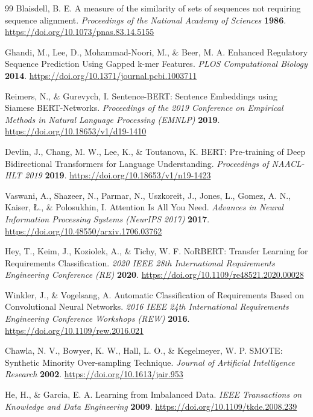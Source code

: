 \begin{thebibliography}{99}
Blaisdell, B. E. A measure of the similarity of sets of sequences not requiring sequence alignment. \emph{Proceedings of the National Academy of Sciences} \textbf{1986}. \url{https://doi.org/10.1073/pnas.83.14.5155}

Ghandi, M., Lee, D., Mohammad-Noori, M., \& Beer, M. A. Enhanced Regulatory Sequence Prediction Using Gapped k-mer Features. \emph{PLOS Computational Biology} \textbf{2014}. \url{https://doi.org/10.1371/journal.pcbi.1003711}

Reimers, N., \& Gurevych, I. Sentence-BERT: Sentence Embeddings using Siamese BERT-Networks. \emph{Proceedings of the 2019 Conference on Empirical Methods in Natural Language Processing (EMNLP)} \textbf{2019}. \url{https://doi.org/10.18653/v1/d19-1410}

Devlin, J., Chang, M. W., Lee, K., \& Toutanova, K. BERT: Pre-training of Deep Bidirectional Transformers for Language Understanding. \emph{Proceedings of NAACL-HLT 2019} \textbf{2019}. \url{https://doi.org/10.18653/v1/n19-1423}

Vaswani, A., Shazeer, N., Parmar, N., Uszkoreit, J., Jones, L., Gomez, A. N., Kaiser, Ł., \& Polosukhin, I. Attention Is All You Need. \emph{Advances in Neural Information Processing Systems (NeurIPS 2017)} \textbf{2017}. \url{https://doi.org/10.48550/arxiv.1706.03762}

Hey, T., Keim, J., Koziolek, A., \& Tichy, W. F. NoRBERT: Transfer Learning for Requirements Classification. \emph{2020 IEEE 28th International Requirements Engineering Conference (RE)} \textbf{2020}. \url{https://doi.org/10.1109/re48521.2020.00028}

Winkler, J., \& Vogelsang, A. Automatic Classification of Requirements Based on Convolutional Neural Networks. \emph{2016 IEEE 24th International Requirements Engineering Conference Workshops (REW)} \textbf{2016}. \url{https://doi.org/10.1109/rew.2016.021}

Chawla, N. V., Bowyer, K. W., Hall, L. O., \& Kegelmeyer, W. P. SMOTE: Synthetic Minority Over-sampling Technique. \emph{Journal of Artificial Intelligence Research} \textbf{2002}. \url{https://doi.org/10.1613/jair.953}

He, H., \& Garcia, E. A. Learning from Imbalanced Data. \emph{IEEE Transactions on Knowledge and Data Engineering} \textbf{2009}. \url{https://doi.org/10.1109/tkde.2008.239}


\end{thebibliography}
